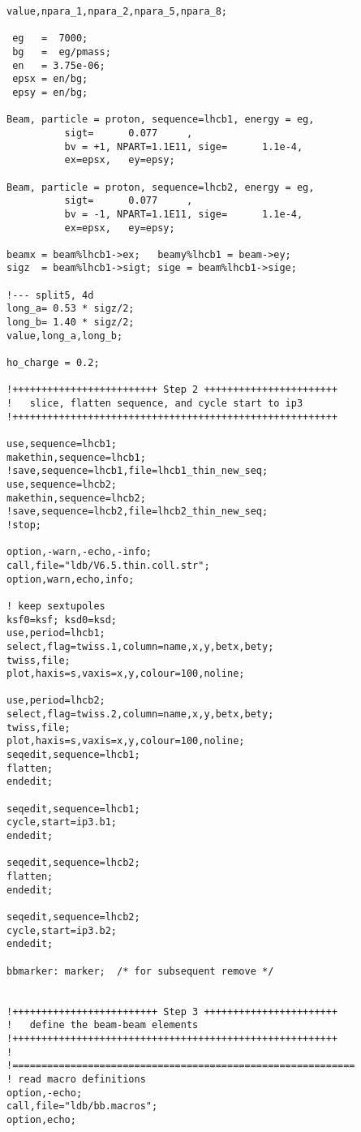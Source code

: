 \begin{verbatim}
value,npara_1,npara_2,npara_5,npara_8;

 eg   =  7000;
 bg   =  eg/pmass;
 en   = 3.75e-06;
 epsx = en/bg;
 epsy = en/bg;

Beam, particle = proton, sequence=lhcb1, energy = eg,
          sigt=      0.077     , 
          bv = +1, NPART=1.1E11, sige=      1.1e-4, 
          ex=epsx,   ey=epsy;

Beam, particle = proton, sequence=lhcb2, energy = eg,
          sigt=      0.077     , 
          bv = -1, NPART=1.1E11, sige=      1.1e-4, 
          ex=epsx,   ey=epsy;

beamx = beam%lhcb1->ex;   beamy%lhcb1 = beam->ey;
sigz  = beam%lhcb1->sigt; sige = beam%lhcb1->sige;

!--- split5, 4d
long_a= 0.53 * sigz/2;
long_b= 1.40 * sigz/2;
value,long_a,long_b;

ho_charge = 0.2;

!+++++++++++++++++++++++++ Step 2 +++++++++++++++++++++++
! 	slice, flatten sequence, and cycle start to ip3
!++++++++++++++++++++++++++++++++++++++++++++++++++++++++

use,sequence=lhcb1;
makethin,sequence=lhcb1;
!save,sequence=lhcb1,file=lhcb1_thin_new_seq;
use,sequence=lhcb2;
makethin,sequence=lhcb2;
!save,sequence=lhcb2,file=lhcb2_thin_new_seq;
!stop;

option,-warn,-echo,-info;
call,file="ldb/V6.5.thin.coll.str";
option,warn,echo,info;

! keep sextupoles
ksf0=ksf; ksd0=ksd;
use,period=lhcb1;
select,flag=twiss.1,column=name,x,y,betx,bety;
twiss,file;
plot,haxis=s,vaxis=x,y,colour=100,noline;

use,period=lhcb2;
select,flag=twiss.2,column=name,x,y,betx,bety;
twiss,file;
plot,haxis=s,vaxis=x,y,colour=100,noline;
seqedit,sequence=lhcb1;
flatten;
endedit;

seqedit,sequence=lhcb1;
cycle,start=ip3.b1;
endedit;

seqedit,sequence=lhcb2;
flatten;
endedit;

seqedit,sequence=lhcb2;
cycle,start=ip3.b2;
endedit;

bbmarker: marker;  /* for subsequent remove */


!+++++++++++++++++++++++++ Step 3 +++++++++++++++++++++++
! 	define the beam-beam elements
!++++++++++++++++++++++++++++++++++++++++++++++++++++++++
!
!===========================================================
! read macro definitions
option,-echo;
call,file="ldb/bb.macros";
option,echo;


\end{verbatim}
